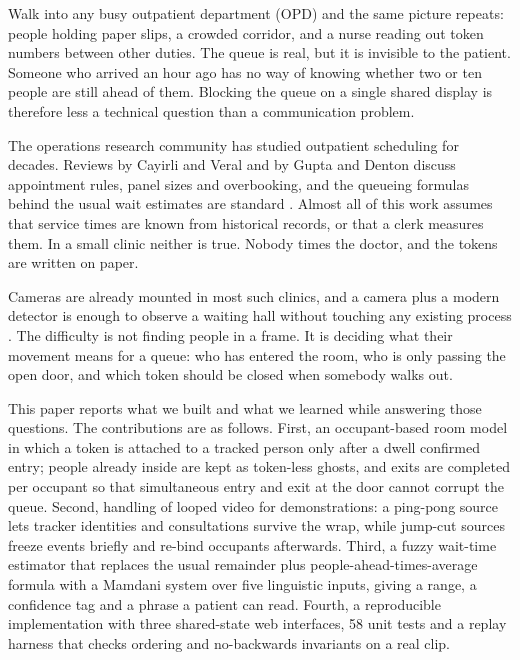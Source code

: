 \documentclass[conference]{IEEEtran}
\begin{document}
Walk into any busy outpatient department (OPD) and the same picture repeats:
people holding paper slips, a crowded corridor, and a nurse reading out token
numbers between other duties. The queue is real, but it is invisible to the
patient. Someone who arrived an hour ago has no way of knowing whether two or
ten people are still ahead of them. Blocking the queue on a single shared
display is therefore less a technical question than a communication problem.

The operations research community has studied outpatient scheduling for
decades. Reviews by Cayirli and Veral \cite{cayirli2003} and by Gupta and Denton
\cite{gupta2008} discuss appointment rules, panel sizes and overbooking, and
the queueing formulas behind the usual wait estimates are standard
\cite{gross2018}. Almost all of this work assumes that service times are known
from historical records, or that a clerk measures them. In a small clinic
neither is true. Nobody times the doctor, and the tokens are written on paper.

Cameras are already mounted in most such clinics, and a camera plus a modern
detector is enough to observe a waiting hall without touching any existing
process \cite{redmon2016yolo,redmon2018yolov3,ultralytics2024}. The difficulty
is not finding people in a frame. It is deciding what their movement means for
a queue: who has entered the room, who is only passing the open door, and which
token should be closed when somebody walks out.

This paper reports what we built and what we learned while answering those
questions. The contributions are as follows. First, an occupant-based room
model in which a token is attached to a tracked person only after a dwell
confirmed entry; people already inside are kept as token-less ghosts, and exits
are completed per occupant so that simultaneous entry and exit at the door
cannot corrupt the queue. Second, handling of looped video for demonstrations:
a ping-pong source lets tracker identities and consultations survive the wrap,
while jump-cut sources freeze events briefly and re-bind occupants afterwards.
Third, a fuzzy wait-time estimator that replaces the usual remainder plus
people-ahead-times-average formula with a Mamdani system over five linguistic
inputs, giving a range, a confidence tag and a phrase a patient can read.
Fourth, a reproducible implementation with three shared-state web interfaces,
58 unit tests and a replay harness that checks ordering and no-backwards
invariants on a real clip.
\end{document}
